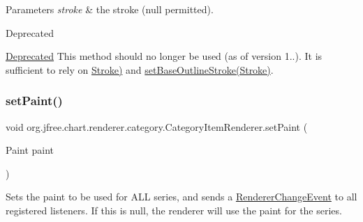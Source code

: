 \begin{DoxyParams}{Parameters}
{\em stroke} & the stroke ({\ttfamily null} permitted).\\
\hline
\end{DoxyParams}
\begin{DoxyRefDesc}{Deprecated}
\item[\mbox{\hyperlink{deprecated__deprecated000162}{Deprecated}}]This method should no longer be used (as of version 1..). It is sufficient to rely on \mbox{\hyperlink{}{Stroke)}} and \mbox{\hyperlink{interfaceorg_1_1jfree_1_1chart_1_1renderer_1_1category_1_1_category_item_renderer_a3440b96cffb9e0312622dc733fb18f73}{set\+Base\+Outline\+Stroke(\+Stroke)}}. \end{DoxyRefDesc}
\mbox{\label{interfaceorg_1_1jfree_1_1chart_1_1renderer_1_1category_1_1_category_item_renderer_ae7591853d51daf28fef33c95c52c6b50}} 
\subsubsection{\texorpdfstring{set\+Paint()}{setPaint()}}
{\footnotesize\ttfamily void org.\+jfree.\+chart.\+renderer.\+category.\+Category\+Item\+Renderer.\+set\+Paint (\begin{DoxyParamCaption}\item[{Paint}]{paint }\end{DoxyParamCaption})}

Sets the paint to be used for A\+LL series, and sends a \mbox{\hyperlink{}{Renderer\+Change\+Event}} to all registered listeners. If this is {\ttfamily null}, the renderer will use the paint for the series.


